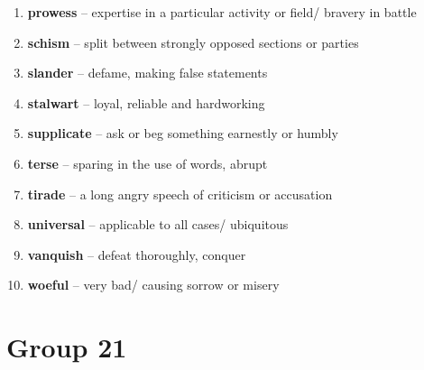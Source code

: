 \begin{enumerate}[wide,labelindent=0pt]
\item \textbf{prowess} -- expertise in a particular activity or field/ bravery in battle
\item \textbf{schism} -- split between strongly opposed sections or parties
\item \textbf{slander} -- defame, making false statements
\item \textbf{stalwart} -- loyal, reliable and hardworking
\item \textbf{supplicate} -- ask or beg something earnestly or humbly
\item \textbf{terse} -- sparing in the use of words, abrupt
\item \textbf{tirade} -- a long angry speech of criticism or accusation
\item \textbf{universal} -- applicable to all cases/ ubiquitous
\item \textbf{vanquish} -- defeat thoroughly, conquer
\item \textbf{woeful} -- very bad/ causing sorrow or misery
\end{enumerate}

\newpage
\section{\color{red}Group 21}

